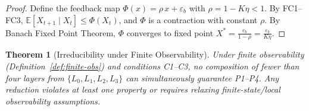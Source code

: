 \documentclass[11pt]{article}
\newtheorem{theorem}{Theorem}[section]
\newcommand{\Layer}[1]{L_{#1}}
\begin{document}
\begin{proof}
Define the feedback map $\Phi(x) = \rho\, x + \varepsilon_b$ with $\rho = 1 - K\eta < 1$. By FC1--FC3, $\mathbb{E}[X_{t+1} \mid X_t] \le \Phi(X_t)$, and $\Phi$ is a contraction with constant $\rho$. By Banach Fixed Point Theorem, $\Phi$ converges to fixed point $X^* = \frac{\varepsilon_b}{1-\rho} = \frac{\varepsilon_b}{K\eta}$.
\end{proof}

\begin{theorem}[Irreducibility under Finite Observability]
\label{thm:irreducibility}
Under finite observability (Definition~\ref{def:finite-obs}) and conditions C1--C3, no composition of fewer than four layers from $\{\Layer{0},\Layer{1},\Layer{2},\Layer{3}\}$ can simultaneously guarantee P1--P4. Any reduction violates at least one property or requires relaxing finite-state/local observability assumptions.
\end{theorem}
\end{document}

